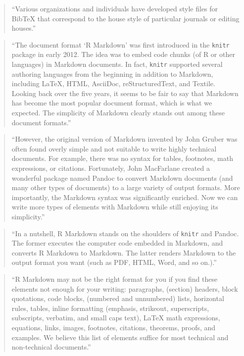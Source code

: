 \documentclass[]{tufte-book}
\begin{document}
\begin{quote}
``Various organizations and individuals have developed style files for
BibTeX that correspond to the house style of particular journals or editing
houses.'' \citep{mittelbach2004latex}
\end{quote}

\begin{quote}
``The document format `R Markdown' was first introduced in the \texttt{knitr}
package in early 2012. The idea was to embed code chunks (of R or other
languages) in Markdown documents. In fact, \texttt{knitr} supported several
authoring languages from the beginning in addition to Markdown, including
LaTeX, HTML, AsciiDoc, reStructuredText, and Textile. Looking back over
the five years, it seems to be fair to say that Markdown has become the
most popular document format, which is what we expected. The simplicity
of Markdown clearly stands out among these document formats.'' \citep{xie2018r}
\end{quote}

\begin{quote}
``However, the original version of Markdown invented by John Gruber was
often found overly simple and not suitable to write highly technical
documents. For example, there was no syntax for tables, footnotes,
math expressions, or citations. Fortunately, John MacFarlane created a
wonderful package named Pandoc to convert Markdown documents (and many
other types of documents) to a large variety of output formats. More
importantly, the Markdown syntax was significantly enriched.
Now we can write more types of elements with Markdown while still enjoying
its simplicity.'' \citep{xie2018r}
\end{quote}

\begin{quote}
``In a nutshell, R Markdown stands on the shoulders of \texttt{knitr} and Pandoc.
The former executes the computer code embedded in Markdown, and converts
R Markdown to Markdown. The latter renders Markdown to the output format
you want (such as PDF, HTML, Word, and so on.).'' \citep{xie2018r}
\end{quote}

\begin{quote}
``R Markdown may not be the right format for you if you find these elements
not enough for your writing: paragraphs, (section) headers, block quotations,
code blocks, (numbered and unnumbered) lists, horizontal rules, tables, inline
formatting (emphasis, strikeout, superscripts, subscripts, verbatim, and
small caps text), LaTeX math expressions, equations, links, images, footnotes,
citations, theorems, proofs, and examples. We believe this list of elements
suffice for most technical and non-technical documents.'' \citep{xie2018r}
\end{quote}
\end{document}
